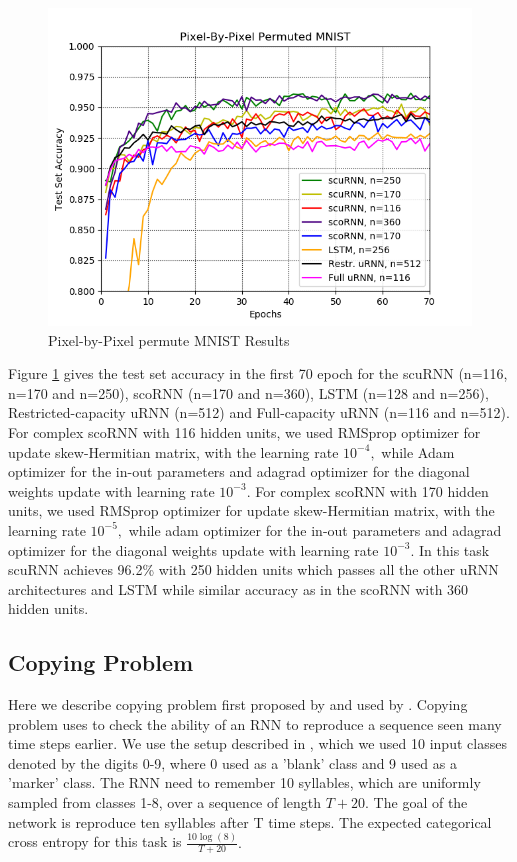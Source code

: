 \documentclass[letterpaper]{article} %
\begin{document}
\vspace{-0.2in}
\begin{figure}
\centering
\includegraphics[width=0.8\linewidth]{Mnist_permuted.png}
  \caption{Pixel-by-Pixel permute MNIST Results}
  \label{fig_mnist2}
\end{figure}

\noindent Figure \ref{fig_mnist2} gives the test set accuracy in the first 70 epoch for the scuRNN (n=116, n=170 and n=250), scoRNN (n=170 and n=360), LSTM (n=128 and n=256), Restricted-capacity uRNN (n=512) and Full-capacity uRNN (n=116 and n=512). For complex scoRNN with 116 hidden units, we used RMSprop optimizer for update skew-Hermitian matrix, with the learning rate $10^{-4},$ while Adam optimizer for the in-out parameters and adagrad optimizer for the diagonal weights update with learning rate $10^{-3}$. For complex scoRNN with 170 hidden units, we used RMSprop optimizer for update skew-Hermitian matrix, with the learning rate $10^{-5},$ while adam optimizer for the in-out parameters and adagrad optimizer for the diagonal weights update with learning rate $10^{-3}$. In this task scuRNN achieves 96.2\% with 250 hidden units which passes all the other uRNN architectures and LSTM while similar accuracy as in the scoRNN with 360 hidden units. \\

\subsection{Copying Problem}
\noindent Here we describe copying problem first proposed by \cite{Arjo16} and used by \cite{kyle17}. Copying problem uses to check the ability of an RNN to reproduce a sequence seen many time steps earlier. We use the setup described in \cite{kyle17}, which we used 10 input classes denoted by the digits 0-9, where 0 used as a 'blank' class and 9 used as a 'marker' class. The RNN need to remember 10 syllables, which are uniformly sampled from classes 1-8, over a sequence of length $T+20.$ The goal of the network is reproduce ten syllables after T time steps. The expected categorical cross entropy for this task is $\frac{10 \log (8)}{T+20}.$\\
\end{document}
